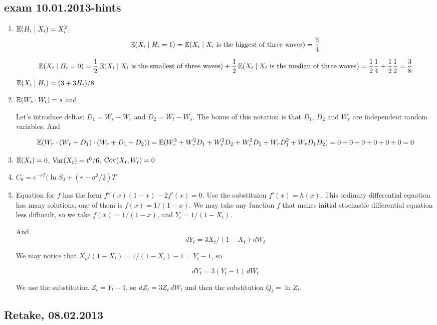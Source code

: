 \documentclass[12pt, a4paper]{article}
\begin{document}
\subsection{exam 10.01.2013-hints}
\begin{enumerate}
\item $\operatorname{\mathbb{E}}(H_i \mid X_i)=X_i^2$,
\[
\operatorname{\mathbb{E}}(X_i \mid H_i=1)= \operatorname{\mathbb{E}}(X_i \mid X_i \text{ is the biggest of three waves}) = \frac{3}{4}
\]

\[
\operatorname{\mathbb{E}}(X_i \mid H_i=0)=\frac{1}{2}\operatorname{\mathbb{E}}(X_i \mid X_i \text{ is the smallest of three waves}) + \frac{1}{2}\operatorname{\mathbb{E}}(X_i \mid X_i \text{ is the median of three waves}) = \frac{1}{2}\frac{1}{4} + \frac{1}{2}\frac{1}{2}=\frac{3}{8}
\]
$\operatorname{\mathbb{E}}(X_i \mid H_i)= (3+3H_i)/8$
\item $\operatorname{\mathbb{E}}(W_s \cdot W_t)=s$ and

Let's introduce deltas: $D_1 = W_s - W_r$ and $D_2 = W_t - W_s$. The bonus of this notation is that $D_1$, $D_2$ and $W_r$ are independent random variables. And

\[
\operatorname{\mathbb{E}}(W_r \cdot (W_r + D_1) \cdot (W_r + D_1 + D_2))=\operatorname{\mathbb{E}}(W_r^3 + W_r^2 D_1 + W_r^2 D_2 + W_r^2 D_1 + W_r D_1^2 + W_r D_1 D_2) = 0 + 0 + 0 + 0 + 0 + 0 = 0
\]



\item $\operatorname{\mathbb{E}}(X_t)=0$, $\operatorname{Var}(X_t)=t^6/6$, $\operatorname{Cov}(X_t,W_t)=0$
\item $C_0=e^{-rT}(\ln S_0+(r-\sigma^2/2)T$
\item Equation for $f$ has the form $f''(x)(1-x)-2f'(x)=0$. Use the substituion $f'(x)=h(x)$. This ordinary differential equation has many solutions, one of them is $f(x)=1/(1-x)$.   We may take any function $f$ that makes initial stochastic differential equation less diffucult, so we take $f(x)=1/(1-x)$, and  $Y_t=1/(1-X_t)$.

And
\[
dY_t = 3X_t / (1-X_t) \, dW_t
\]

We may notice that $X_t/(1-X_t)=1/(1-X_t)-1=Y_t-1$, so

\[
dY_t= 3(Y_t-1) \, dW_t
\]

We use the substitution $Z_t=Y_t-1$, so $dZ_t=3Z_t \, dW_t$ and then the substitution $Q_t = \ln Z_t$.


\end{enumerate}




\subsection{Retake, 08.02.2013}
\end{document}
